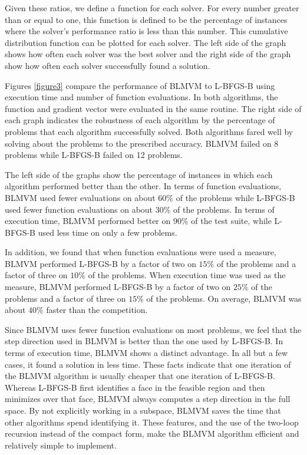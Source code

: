 Given these ratios, we define a function for each solver.  For every
number greater than or equal to one, this function is
defined to be the percentage of instances where the solver's performance
ratio is less than this number.  This cumulative distribution function
can be plotted for each solver.
The left side of the graph shows how often each solver was the best solver
and the right side of the graph show how often each solver successfully
found a solution.

Figures \ref{figure3} compare the performance of BLMVM to L-BFGS-B
using execution time and number of function evaluations. In both
algorithms, the function and gradient vector were evaluated in
the same routine.
The right side of each graph indicates the robustness of each algorithm
by the percentage of problems that
each algorithm successfully solved.  
Both algorithms fared well by solving about %
the problems to the prescribed accuracy.  BLMVM failed on 8 problems
while L-BFGS-B failed on 12 problems.

The left side of the graphs show the percentage of instances in which each
algorithm performed better than the other.  In terms of function
evaluations, BLMVM used fewer evaluations on about $60\%$ of the problems
while L-BFGS-B used fewer function evaluations on about $30\%$ of the problems.
In terms of execution time, BLMVM performed better on $90\%$ of the test suite,
while  L-BFGS-B used less time on only a few problems.

In addition, we found that when function evaluations were used a measure,
BLMVM performed L-BFGS-B by a factor of two on $15\%$ of the problems and
a factor of three on $10\%$ of the problems.   When execution time was used
as the measure, BLMVM performed L-BFGS-B by a factor of two on $25\%$ of the problems and
a factor of three on $15\%$ of the problems.
On average, BLMVM was about $40\%$ faster than
the competition.  

Since BLMVM uses fewer function evaluations on most problems, we feel that the
step direction used in BLMVM is better than the one used by  L-BFGS-B.  
In terms of execution time, BLMVM shows a
distinct advantage.  In all but a few cases, it found a solution
in less time.  These facts indicate that one iteration of the
BLMVM algorithm is usually cheaper that one iteration of L-BFGS-B.
Whereas L-BFGS-B first identifies a face in the feasible region and
then minimizes over that face, BLMVM always computes a step direction
in the full space.  By not explicitly working in a subspace,
BLMVM saves the time that other algorithms spend identifying it.
These features, and the use of the two-loop recursion instead of the compact
form, make the BLMVM algorithm efficient and relatively simple to implement.


